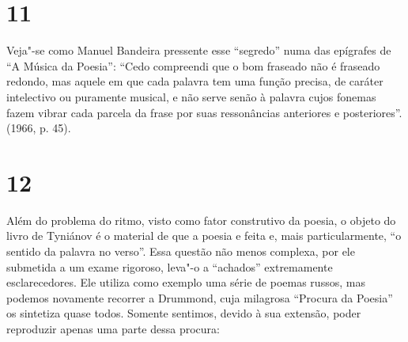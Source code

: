 \section{11}

Veja"-se como Manuel Bandeira pressente esse ``segredo'' numa das
epígrafes de ``A Música da Poesia'': ``Cedo compreendi que o bom fraseado não é
fraseado redondo, mas aquele em que cada palavra tem uma função precisa,
de caráter intelectivo ou puramente musical, e não serve senão à palavra
cujos fonemas fazem vibrar cada parcela da frase por suas ressonâncias
anteriores e posteriores''. (1966, p. 45).

\section{12}

Além do problema do ritmo, visto como fator construtivo da poesia, o
objeto do livro de Tyniánov é o material de que a poesia e feita e, mais
particularmente, ``o sentido da palavra no verso''. Essa questão não
menos complexa, por ele submetida a um exame rigoroso, leva"-o a
``achados'' extremamente esclarecedores. Ele utiliza como exemplo uma
série de poemas russos, mas podemos novamente recorrer a Drummond, cuja
milagrosa ``Procura da Poesia'' os sintetiza quase todos. Somente
sentimos, devido à sua extensão, poder reproduzir apenas uma parte dessa
procura:

